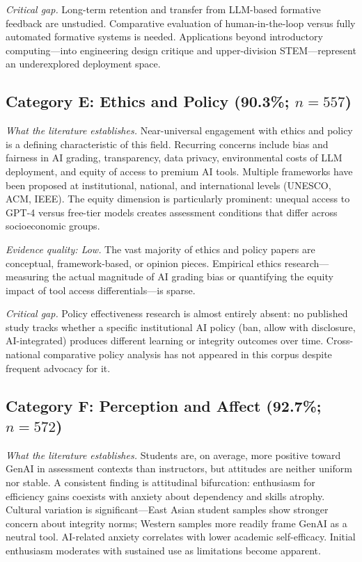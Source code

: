 \documentclass[conference]{IEEEtran}
\begin{document}
\textit{Critical gap.}
Long-term retention and transfer from LLM-based formative feedback are unstudied. Comparative
evaluation of human-in-the-loop versus fully automated formative systems is needed. Applications
beyond introductory computing---into engineering design critique and upper-division STEM---represent
an underexplored deployment space.

\subsection{Category E: Ethics and Policy (90.3\%; $n = 557$)}

\textit{What the literature establishes.}
Near-universal engagement with ethics and policy is a defining characteristic of this field. Recurring
concerns include bias and fairness in AI grading, transparency, data privacy, environmental costs of
LLM deployment, and equity of access to premium AI tools. Multiple frameworks have been proposed at
institutional, national, and international levels (UNESCO, ACM, IEEE). The equity dimension is
particularly prominent: unequal access to GPT-4 versus free-tier models creates assessment conditions
that differ across socioeconomic groups.

\textit{Evidence quality: Low.}
The vast majority of ethics and policy papers are conceptual, framework-based, or opinion pieces.
Empirical ethics research---measuring the actual magnitude of AI grading bias or quantifying the
equity impact of tool access differentials---is sparse.

\textit{Critical gap.}
Policy effectiveness research is almost entirely absent: no published study tracks whether a specific
institutional AI policy (ban, allow with disclosure, AI-integrated) produces different learning or
integrity outcomes over time. Cross-national comparative policy analysis has not appeared in this
corpus despite frequent advocacy for it.

\subsection{Category F: Perception and Affect (92.7\%; $n = 572$)}

\textit{What the literature establishes.}
Students are, on average, more positive toward GenAI in assessment contexts than instructors, but
attitudes are neither uniform nor stable. A consistent finding is attitudinal bifurcation: enthusiasm
for efficiency gains coexists with anxiety about dependency and skills atrophy. Cultural variation is
significant---East Asian student samples show stronger concern about integrity norms; Western samples
more readily frame GenAI as a neutral tool. AI-related anxiety correlates with lower academic
self-efficacy. Initial enthusiasm moderates with sustained use as limitations become apparent.
\end{document}
